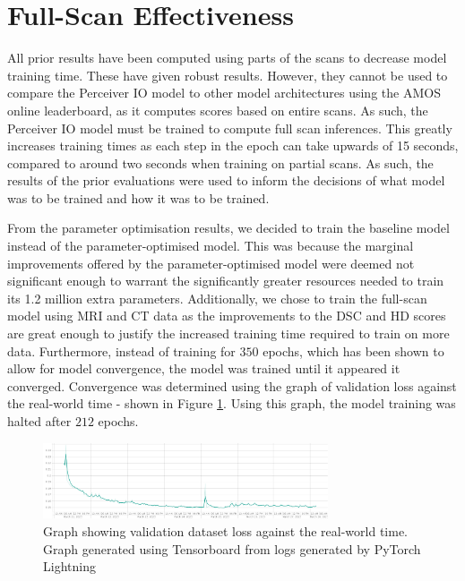 \documentclass{l4proj}
\begin{document}
\section{Full-Scan Effectiveness} \label{sec:eval_full_scan}

All prior results have been computed using parts of the scans to decrease model training time. These have given robust results. However, they cannot be used to compare the Perceiver IO model to other model architectures using the AMOS online leaderboard, as it computes scores based on entire scans. As such, the Perceiver IO model must be trained to compute full scan inferences. This greatly increases training times as each step in the epoch can take upwards of 15 seconds, compared to around two seconds when training on partial scans. As such, the results of the prior evaluations were used to inform the decisions of what model was to be trained and how it was to be trained.

From the parameter optimisation results, we decided to train the baseline model instead of the parameter-optimised model. This was because the marginal improvements offered by the parameter-optimised model were deemed not significant enough to warrant the significantly greater resources needed to train its 1.2 million extra parameters. Additionally, we chose to train the full-scan model using MRI and CT data as the improvements to the DSC and HD scores are great enough to justify the increased training time required to train on more data. Furthermore, instead of training for $350$ epochs, which has been shown to allow for model convergence,  the model was trained until it appeared it converged. Convergence was determined using the  graph of validation loss against the real-world time - shown in Figure \ref{fig:full_scan_tensorboard}. Using this graph, the model training was halted after $212$ epochs.

\begin{figure}[htb] 
    \centering

     \includegraphics[width=0.75\textwidth]{images/val_loss.png}
     \caption{Graph showing validation dataset loss against the real-world time. Graph generated using Tensorboard from logs generated by PyTorch Lightning \citep{Falcon_PyTorch_Lightning_2019}}
     \label{fig:full_scan_tensorboard}
\end{figure}
\end{document}
